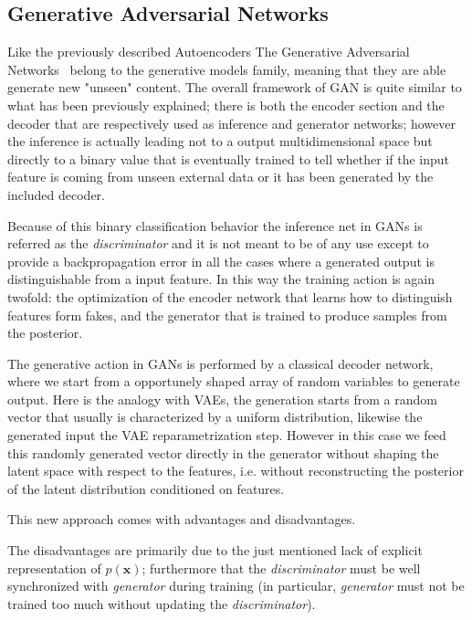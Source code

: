 \subsection{Generative Adversarial Networks}
%
Like the previously described Autoencoders The Generative Adversarial Networks~\cite{goodfellow2014generative} belong to the generative models family, meaning that they are able generate new "unseen" content. The overall framework of GAN is quite similar to what has been previously explained; there is both the encoder section and the decoder that are respectively used as inference and generator networks; however the inference is actually leading not to a output multidimensional space but directly to a binary value that is eventually trained to tell whether if the input feature is coming from unseen external data or it has been generated by the included decoder.

Because of this binary classification behavior the inference net in GANs is referred as the \textit{discriminator} and it is not meant to be of any use except to provide a backpropagation error in all the cases where a generated output is distinguishable from a input feature. In this way the training action is again twofold: the optimization of the encoder network that learns how to distinguish features form fakes, and the generator that is trained to produce samples from the posterior.

The generative action in GANs is performed by a classical decoder network, where we start from a opportunely shaped array of random variables to generate output. Here is the analogy with VAEs, the generation starts from a random vector that usually is characterized by a uniform distribution, likewise the generated input the VAE reparametrization step. However in this case we feed this randomly generated vector directly in the generator without shaping the latent space with respect to the features, i.e. without reconstructing the posterior of the latent distribution conditioned on features.

This new approach comes with advantages and disadvantages. 

The disadvantages are primarily due to the just mentioned lack of explicit representation of $p(\bm{x})$; furthermore that the \textit{discriminator} must be well synchronized with \textit{generator} during training (in particular, \textit{generator} must not be trained too much without updating the \textit{discriminator}).

